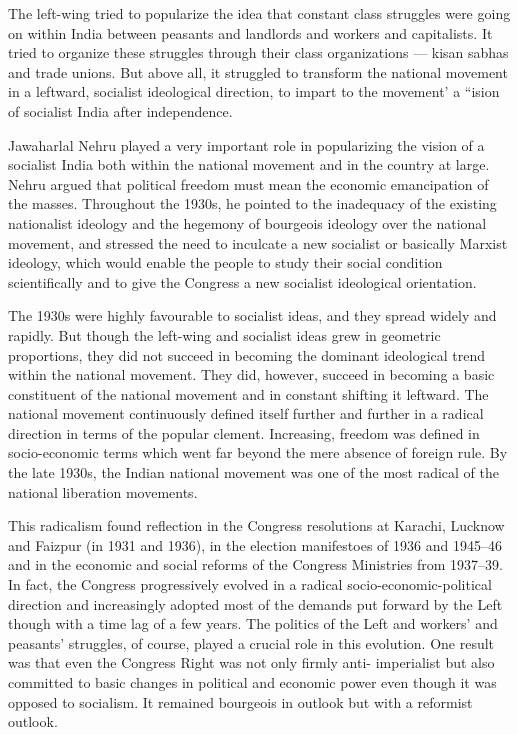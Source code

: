 \begin{multicols}{2}
The left-wing tried to popularize the idea that constant class struggles were going on within India between peasants and landlords and workers and capitalists. It tried to organize these struggles through their class organizations --- kisan sabhas and trade unions. But above all, it struggled to transform the national movement in a leftward, socialist ideological direction, to impart to the movement' a ``ision of socialist India after independence.

Jawaharlal Nehru played a very important role in popularizing the vision of a socialist India both within the national movement and in the country at large. Nehru argued that political freedom must mean the economic emancipation of the masses. Throughout the 1930s, he pointed to the inadequacy of the existing nationalist ideology and the hegemony of bourgeois ideology over the national movement, and stressed the need to inculcate a new socialist or basically Marxist ideology, which would enable the people to study their social condition scientifically and to give the Congress a new socialist ideological orientation.

The 1930s were highly favourable to socialist ideas, and they spread widely and rapidly. But though the left-wing and socialist ideas grew in geometric proportions, they did not succeed in becoming the dominant ideological trend within the national movement. They did, however, succeed in becoming a basic constituent of the national movement and in constant shifting it leftward. The national movement continuously defined itself further and further in a radical direction in terms of the popular clement. Increasing, freedom was defined in socio-economic terms which went far beyond the mere absence of foreign rule. By the late 1930s, the Indian national movement was one of the most radical of the national liberation movements.

This radicalism found reflection in the Congress resolutions at Karachi, Lucknow and Faizpur (in 1931 and 1936), in the election manifestoes of 1936 and 1945--46 and in the economic and social reforms of the Congress Ministries from 1937--39. In fact, the Congress progressively evolved in a radical socio-economic-political direction and increasingly adopted most of the demands put forward by the Left though with a time lag of a few years. The politics of the Left and workers' and peasants' struggles, of course, played a crucial role in this evolution. One result was that even the Congress Right was not only firmly anti- imperialist but also committed to basic changes in political and economic power even though it was opposed to socialism. It remained bourgeois in outlook but with a reformist outlook.


\end{multicols}
